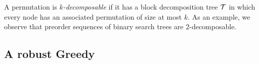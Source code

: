 A permutation is \emph{$k$-decomposable} if it has a block decomposition tree ${\mathcal T}$ in which every node has an associated permutation of size at most $k$. As an example, we observe that preorder sequences of binary search trees are $2$-decomposable. 







 
 
\subsection{A robust {\sc Greedy}}



